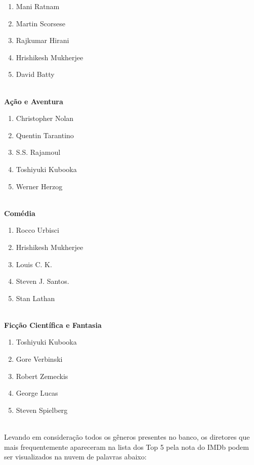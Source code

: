 \documentclass[a4paper, 12pt]{article} %
\begin{document}
\begin{enumerate}[topsep=0pt,partopsep=0pt]
    \item Mani Ratnam
    \item Martin Scorsese
    \item Rajkumar Hirani
    \item Hrishikesh Mukherjee
    \item David Batty
\end{enumerate}\\


\textbf{Ação e Aventura}
\begin{enumerate}[topsep=0pt,partopsep=0pt]
    \item Christopher Nolan
    \item Quentin Tarantino
    \item S.S. Rajamoul
    \item Toshiyuki Kubooka
    \item Werner Herzog
\end{enumerate}\\


\textbf{Comédia}
\begin{enumerate}[topsep=0pt,partopsep=0pt]
    \item Rocco Urbisci
    \item Hrishikesh Mukherjee
    \item Louis C. K.
    \item Steven J. Santos.
    \item Stan Lathan
\end{enumerate}\\


\textbf{Ficção Científica e Fantasia}
\begin{enumerate}[topsep=0pt,partopsep=0pt]
    \item Toshiyuki Kubooka
    \item Gore Verbinski
    \item Robert Zemeckis
    \item George Lucas
    \item Steven Spielberg
\end{enumerate}\\

Levando em consideração todos os gêneros presentes no banco, os diretores que mais frequentemente apareceram na lista dos Top 5 pela nota do IMDb podem ser visualizados na nuvem de palavras abaixo:\\
\end{document}
